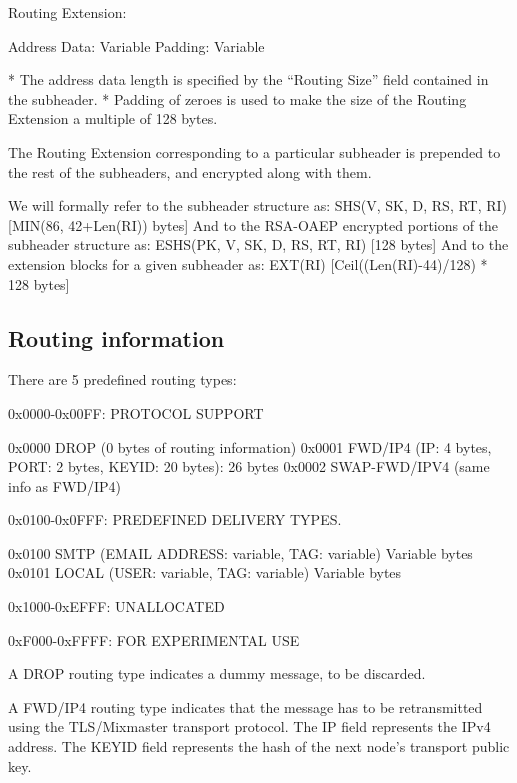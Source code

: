   Routing Extension:

    Address Data:     Variable
    Padding:          Variable

* The address data length is specified by the ``Routing Size'' field
  contained in the subheader.
* Padding of zeroes is used to make the size of the Routing Extension a
  multiple of 128 bytes.

The Routing Extension corresponding to a particular subheader is
prepended to the rest of the subheaders, and encrypted along with
them.

We will formally refer to the subheader structure as:
SHS(V, SK, D, RS, RT, RI)     [MIN(86, 42+Len(RI)) bytes] 
And to the RSA-OAEP encrypted portions of the subheader structure as:
ESHS(PK, V, SK, D, RS, RT, RI)   [128 bytes]
And to the extension blocks for a given subheader as:
EXT(RI)                       [Ceil((Len(RI)-44)/128) * 128 bytes]

\subsection{Routing information}

There are 5 predefined routing types:

0x0000-0x00FF: PROTOCOL SUPPORT

0x0000 DROP    (0 bytes of routing information)
0x0001 FWD/IP4 (IP: 4 bytes, PORT: 2 bytes, KEYID: 20 bytes): 26 bytes
0x0002 SWAP-FWD/IPV4 (same info as FWD/IP4)

0x0100-0x0FFF: PREDEFINED DELIVERY TYPES.

0x0100 SMTP   (EMAIL ADDRESS: variable, TAG: variable) Variable bytes
0x0101 LOCAL  (USER: variable, TAG: variable) Variable bytes

0x1000-0xEFFF: UNALLOCATED

0xF000-0xFFFF: FOR EXPERIMENTAL USE

A DROP routing type indicates a dummy message, to be discarded.

A FWD/IP4 routing type indicates that the message has to be
retransmitted using the TLS/Mixmaster transport protocol. The IP field
represents the IPv4 address.  The KEYID field represents the hash of
the next node's transport public key.

